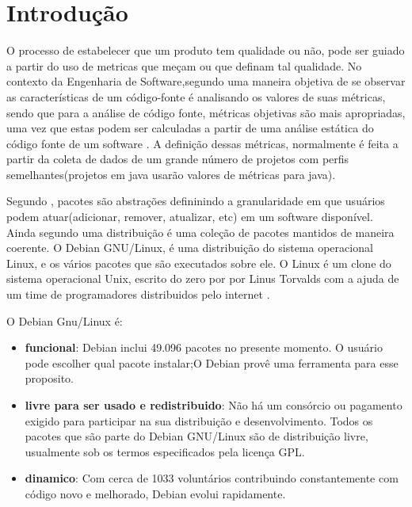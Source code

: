 \chapter*[Introdução]{Introdução}

O processo de estabelecer que um produto tem qualidade ou não, pode ser guiado a partir do uso de metricas que meçam ou que definam tal qualidade.
No contexto da Engenharia de Software,segundo \cite{Meirelles} uma maneira objetiva de se observar as características de um código-fonte é analisando
os valores de suas métricas, sendo que para a análise de código fonte, métricas objetivas são mais apropriadas, uma vez que estas podem ser calculadas a partir de uma análise estática do código fonte de um software \cite{Meirelles}. A definição dessas métricas, normalmente é feita a partir da coleta de dados de um grande número de projetos com perfis
semelhantes(projetos em java usarão valores de métricas para java). 

Segundo \cite{Zacchiroli}, pacotes são abstrações defininindo a granularidade em que usuários podem atuar(adicionar, remover, atualizar, etc) em um software disponível. Ainda
segundo \cite{Zacchiroli} uma distribuição é uma coleção de pacotes mantidos de maneira coerente.
O Debian GNU/Linux, é uma distribuição do sistema operacional Linux, e os vários pacotes que são executados sobre ele\cite{Debian}.
O Linux é um clone do sistema operacional Unix, escrito do zero por por Linus Torvalds com a ajuda de um time de programadores distribuidos pelo internet \cite{Linux}.

O Debian Gnu/Linux é:
        \begin{itemize}
        \item \textbf{funcional}: Debian inclui 49.096 pacotes no presente momento. O usuário
        pode escolher qual pacote instalar;O Debian provê uma ferramenta para esse proposito.\cite{Debian}

        \item \textbf{livre para ser usado e redistribuido}: Não há um consórcio ou pagamento exigido para participar na sua distribuição e desenvolvimento.
        Todos os pacotes que são parte do Debian GNU/Linux são de distribuição livre, usualmente sob os termos especificados pela licença GPL.\cite{Debian}

        \item \textbf{dinamico}: Com cerca de 1033 voluntários contribuindo constantemente com código novo e melhorado, Debian evolui rapidamente.\cite{Debian}
        \end{itemize}


